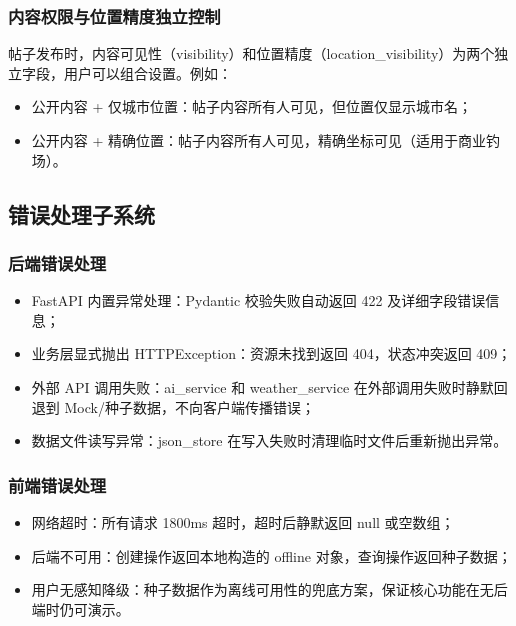 \documentclass[12pt,a4paper]{ctexart}
\begin{document}
\subsubsection{内容权限与位置精度独立控制}

帖子发布时，内容可见性（visibility）和位置精度（location\_visibility）为两个独立字段，用户可以组合设置。例如：
\begin{itemize}
  \item 公开内容 + 仅城市位置：帖子内容所有人可见，但位置仅显示城市名；
  \item 公开内容 + 精确位置：帖子内容所有人可见，精确坐标可见（适用于商业钓场）。
\end{itemize}

\subsection{错误处理子系统}

\subsubsection{后端错误处理}

\begin{itemize}
  \item FastAPI 内置异常处理：Pydantic 校验失败自动返回 422 及详细字段错误信息；
  \item 业务层显式抛出 HTTPException：资源未找到返回 404，状态冲突返回 409；
  \item 外部 API 调用失败：ai\_service 和 weather\_service 在外部调用失败时静默回退到 Mock/种子数据，不向客户端传播错误；
  \item 数据文件读写异常：json\_store 在写入失败时清理临时文件后重新抛出异常。
\end{itemize}

\subsubsection{前端错误处理}

\begin{itemize}
  \item 网络超时：所有请求 1800ms 超时，超时后静默返回 null 或空数组；
  \item 后端不可用：创建操作返回本地构造的 offline 对象，查询操作返回种子数据；
  \item 用户无感知降级：种子数据作为离线可用性的兜底方案，保证核心功能在无后端时仍可演示。
\end{itemize}
\end{document}
